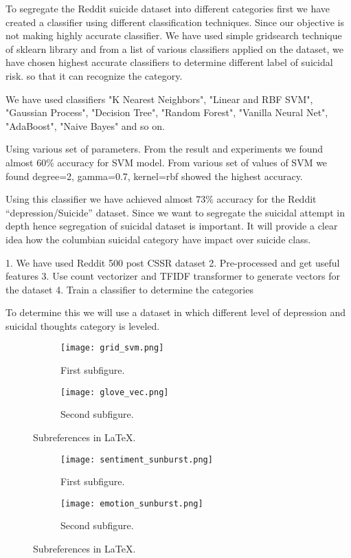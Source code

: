 \documentclass[12pt, letterpaper]{article}
\begin{document}
To segregate the Reddit suicide dataset into different categories first we have created a classifier using different classification techniques. Since our objective is not making highly accurate classifier. We have used simple gridsearch technique of sklearn library and from a list of various classifiers applied on the dataset, we have chosen highest accurate classifiers to determine different label of suicidal risk. so that it can recognize the category. 

We have used classifiers "K Nearest Neighbors", "Linear and RBF SVM", "Gaussian Process", "Decision Tree", "Random Forest", "Vanilla Neural Net", "AdaBoost", "Naive Bayes" and so on. 

Using various set of parameters. From the result and experiments we found almost 60\% accuracy for SVM model. From various set of values of SVM we found degree=2, gamma=0.7, kernel=rbf
showed the highest accuracy. 

Using this classifier we have achieved almost 73\% accuracy for the Reddit “depression/Suicide” dataset. Since we want to segregate the suicidal attempt in depth hence segregation of suicidal dataset is important. It will provide a clear idea how the columbian suicidal category have impact over suicide class. 

1. We have used Reddit 500 post CSSR dataset
2. Pre-processed and get useful features
3. Use count vectorizer and TFIDF transformer to generate vectors for the dataset
4. Train a classifier to determine the categories 

To determine this we will use a dataset in which different level of depression and suicidal thoughts category is leveled. 

\begin{figure}[H]
\centering
\begin{subfigure}{0.45\textwidth}
    \texttt{[image: grid\_svm.png]}
    \caption{First subfigure.}
    \label{fig:first}
\end{subfigure}
\hfill
\begin{subfigure}{0.45\textwidth}
    \texttt{[image: glove\_vec.png]}
    \caption{Second subfigure.}
    \label{fig:second}
\end{subfigure}
        
\caption{Subreferences in \LaTeX.}
\label{fig:figures}
\end{figure}


\begin{figure}[H]
\centering
\begin{subfigure}{0.45\textwidth}
    \texttt{[image: sentiment\_sunburst.png]}
    \caption{First subfigure.}
    \label{fig:first}
\end{subfigure}
\hfill
\begin{subfigure}{0.45\textwidth}
    \texttt{[image: emotion\_sunburst.png]}
    \caption{Second subfigure.}
    \label{fig:second}
\end{subfigure}
        
\caption{Subreferences in \LaTeX.}
\label{fig:figures}
\end{figure}

\end{document}
